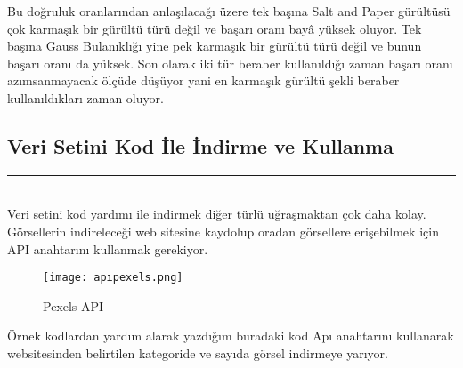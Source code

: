 \documentclass{article}
\begin{document}
\begin{table}[h!]
    \centering
    \label{tab:ModelDoğrulukları}
    \caption{Gürültü Türlerinin Etkisi}
\end{table}

\newpage
\noindent Bu doğruluk oranlarından anlaşılacağı üzere tek başına Salt and Paper gürültüsü çok karmaşık bir gürültü türü değil ve başarı oranı bayâ yüksek oluyor. Tek başına Gauss Bulanıklığı yine pek karmaşık bir gürültü türü değil ve bunun başarı oranı da yüksek. Son olarak iki tür beraber kullanıldığı zaman başarı oranı azımsanmayacak ölçüde düşüyor yani en karmaşık gürültü şekli beraber kullanıldıkları zaman oluyor.


\subsection{Veri Setini Kod İle İndirme ve Kullanma}
\rule{\textwidth}{0.5pt}\\[10pt]

\noindent Veri setini kod yardımı ile indirmek diğer türlü uğraşmaktan çok daha kolay. Görsellerin indireleceği web sitesine kaydolup oradan görsellere erişebilmek için API anahtarını kullanmak gerekiyor.\\[10pt]


\renewcommand{\figurename}{Şekil}
\begin{figure}[htbp]
     \centering
\texttt{[image: apıpexels.png]}\centering 
  \caption{Pexels API \cite{API}}
  \label{fig:resim_etiketi}
\end{figure}


\noindent Örnek kodlardan yardım alarak\cite{geeksforgeeks} yazdığım buradaki kod Apı anahtarını kullanarak websitesinden belirtilen kategoride ve sayıda görsel indirmeye yarıyor.\\[10pt]
\end{document}
